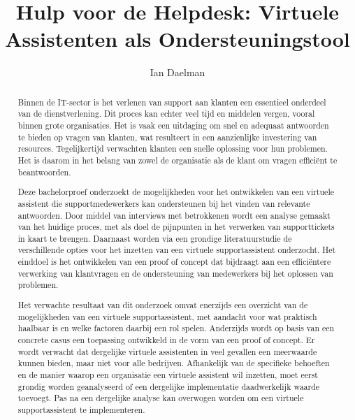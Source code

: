\documentclass{hogent-article}
\title{Hulp voor de Helpdesk: Virtuele Assistenten als Ondersteuningstool}
\author{Ian Daelman}
\begin{document}
\begin{abstract}
  
  Binnen de IT-sector is het verlenen van support aan klanten een essentieel onderdeel van de dienstverlening. Dit proces kan echter veel tijd en middelen vergen, vooral binnen grote organisaties. Het is vaak een uitdaging om snel en adequaat antwoorden te bieden op vragen van klanten, wat resulteert in een aanzienlijke investering van resources. Tegelijkertijd verwachten klanten een snelle oplossing voor hun problemen. Het is daarom in het belang van zowel de organisatie als de klant om vragen efficiënt te beantwoorden.
  
  Deze bachelorproef onderzoekt de mogelijkheden voor het ontwikkelen van een virtuele assistent die supportmedewerkers kan ondersteunen bij het vinden van relevante antwoorden. Door middel van interviews met betrokkenen wordt een analyse gemaakt van het huidige proces, met als doel de pijnpunten in het verwerken van supporttickets in kaart te brengen. Daarnaast worden via een grondige literatuurstudie de verschillende opties voor het inzetten van een virtuele supportassistent onderzocht. Het einddoel is het ontwikkelen van een proof of concept dat bijdraagt aan een efficiëntere verwerking van klantvragen en de ondersteuning van medewerkers bij het oplossen van problemen.
  
  Het verwachte resultaat van dit onderzoek omvat enerzijds een overzicht van de mogelijkheden van een virtuele supportassistent, met aandacht voor wat praktisch haalbaar is en welke factoren daarbij een rol spelen. Anderzijds wordt op basis van een concrete casus een toepassing ontwikkeld in de vorm van een proof of concept. Er wordt verwacht dat dergelijke virtuele assistenten in veel gevallen een meerwaarde kunnen bieden, maar niet voor alle bedrijven. Afhankelijk van de specifieke behoeften en de manier waarop een organisatie een virtuele assistent wil inzetten, moet eerst grondig worden geanalyseerd of een dergelijke implementatie daadwerkelijk waarde toevoegt. Pas na een dergelijke analyse kan overwogen worden om een virtuele supportassistent te implementeren.
  
 
\end{abstract}

\tableofcontents



\printbibliography[heading=bibintoc]
\end{document}
